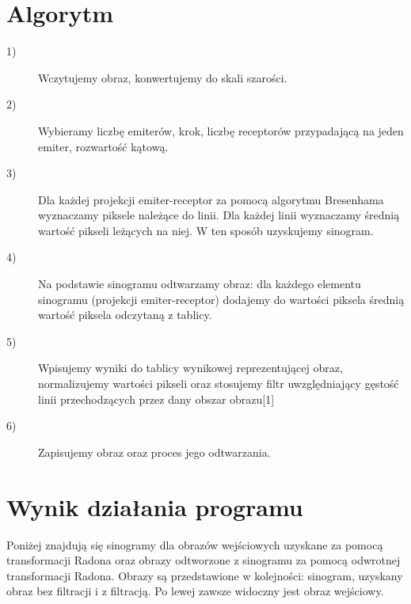 \documentclass{article}
\begin{document}


\section{Algorytm}
\begin{description}
\item[1)] Wczytujemy obraz, konwertujemy do skali szarości.
\item[2)] Wybieramy liczbę emiterów, krok, liczbę receptorów przypadającą na jeden emiter, rozwartość kątową.
\item[3)] Dla każdej projekcji emiter-receptor za pomocą algorytmu Bresenhama wyznaczamy piksele należące do linii. Dla każdej linii wyznaczamy średnią wartość pikseli leżących na niej. W ten sposób uzyskujemy sinogram.
\item[4)] Na podstawie sinogramu odtwarzamy obraz: dla każdego elementu sinogramu (projekcji emiter-receptor) dodajemy do wartości piksela średnią wartość piksela odczytaną z tablicy. 
\item[5)] Wpisujemy wyniki do tablicy wynikowej reprezentującej obraz, normalizujemy wartości pikseli oraz stosujemy filtr uwzględniający gęstość linii przechodzących przez dany obszar obrazu[1]
\item[6)] Zapisujemy obraz oraz proces jego odtwarzania.
\end{description}
 
\section{Wynik działania programu}
Poniżej znajdują się sinogramy dla obrazów wejściowych uzyskane za pomocą transformacji Radona oraz obrazy odtworzone z sinogramu za pomocą odwrotnej transformacji Radona. Obrazy są przedstawione w kolejności: sinogram, uzyskany obraz bez filtracji i z filtracją. Po lewej zawsze widoczny jest obraz wejściowy.
\end{document}
